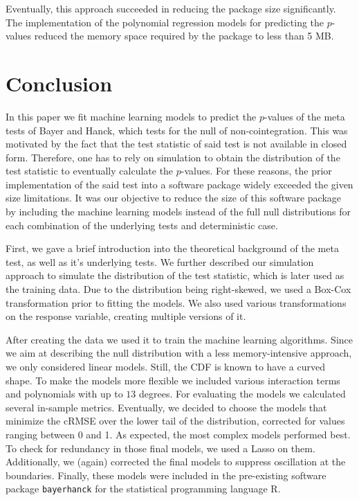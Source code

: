 \documentclass[12pt,a4paper]{article}
\begin{document}
Eventually, this approach succeeded in reducing the package size
significantly. The implementation of the polynomial regression models
for predicting the \(p\)-values reduced the memory space required by the
package to less than 5 MB.

\hypertarget{conclusion}{%
\section{Conclusion}\label{conclusion}}

In this paper we fit machine learning models to predict the \(p\)-values
of the meta tests of Bayer and Hanck, which tests for the null of
non-cointegration. This was motivated by the fact that the test
statistic of said test is not available in closed form. Therefore, one
has to rely on simulation to obtain the distribution of the test
statistic to eventually calculate the \(p\)-values. For these reasons,
the prior implementation of the said test into a software package widely
exceeded the given size limitations. It was our objective to reduce the
size of this software package by including the machine learning models
instead of the full null distributions for each combination of the
underlying tests and deterministic case.

First, we gave a brief introduction into the theoretical background of
the meta test, as well as it's underlying tests. We further described
our simulation approach to simulate the distribution of the test
statistic, which is later used as the training data. Due to the
distribution being right-skewed, we used a Box-Cox transformation prior
to fitting the models. We also used various transformations on the
response variable, creating multiple versions of it.

After creating the data we used it to train the machine learning
algorithms. Since we aim at describing the null distribution with a less
memory-intensive approach, we only considered linear models. Still, the
\ac{CDF} is known to have a curved shape. To make the models more
flexible we included various interaction terms and polynomials with up
to \(13\) degrees. For evaluating the models we calculated several
in-sample metrics. Eventually, we decided to choose the models that
minimize the \ac{cRMSE} over the lower tail of the distribution,
corrected for values ranging between 0 and 1. As expected, the most
complex models performed best. To check for redundancy in those final
models, we used a \ac{Lasso} on them. Additionally, we (again) corrected
the final models to suppress oscillation at the boundaries. Finally,
these models were included in the pre-existing software package
\texttt{bayerhanck} for the statistical programming language R.
\end{document}
